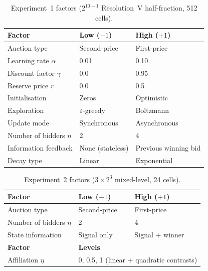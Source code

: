 \begin{table}[H]
\centering
\caption{Experiment~1 factors ($2^{10-1}$ Resolution~V half-fraction, 512 cells).}
\label{tab:exp1_factors}
\small
\begin{tabular}{lll}
\toprule
\textbf{Factor} & \textbf{Low ($-1$)} & \textbf{High ($+1$)} \\
\midrule
Auction type      & Second-price & First-price \\
Learning rate $\alpha$ & 0.01 & 0.10 \\
Discount factor $\gamma$ & 0.0 & 0.95 \\
Reserve price $r$ & 0.0 & 0.5 \\
Initialisation    & Zeros & Optimistic \\
Exploration       & $\varepsilon$-greedy & Boltzmann \\
Update mode       & Synchronous & Asynchronous \\
Number of bidders $n$ & 2 & 4 \\
Information feedback & None (stateless) & Previous winning bid \\
Decay type        & Linear & Exponential \\
\bottomrule
\end{tabular}
\end{table}

\begin{table}[H]
\centering
\caption{Experiment~2 factors ($3 \times 2^3$ mixed-level, 24 cells).}
\label{tab:exp2_factors}
\small
\begin{tabular}{lll}
\toprule
\textbf{Factor} & \textbf{Low ($-1$)} & \textbf{High ($+1$)} \\
\midrule
Auction type      & Second-price & First-price \\
Number of bidders $n$ & 2 & 4 \\
State information & Signal only & Signal + winner \\
\midrule
\textbf{Factor} & \multicolumn{2}{l}{\textbf{Levels}} \\
\midrule
Affiliation $\eta$ & \multicolumn{2}{l}{0, 0.5, 1 (linear + quadratic contrasts)} \\
\bottomrule
\end{tabular}
\end{table}

